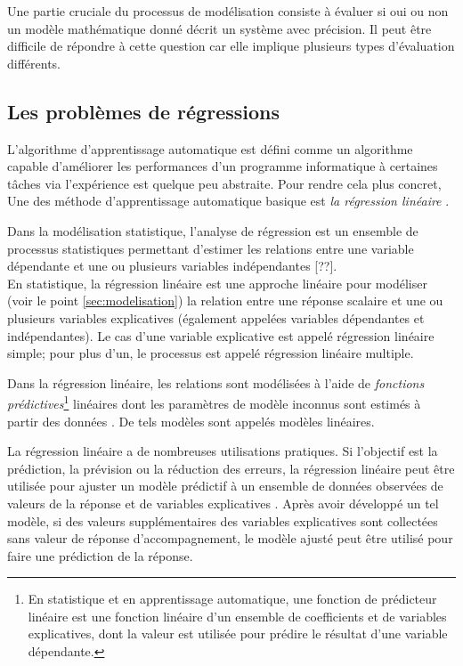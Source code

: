	
	Une partie cruciale du processus de modélisation consiste à évaluer si oui ou non un modèle mathématique donné décrit un système avec précision. Il peut être difficile de répondre à cette question car elle implique plusieurs types d'évaluation différents.
	
	

	\subsection{Les problèmes de régressions}
	
	L'algorithme d'apprentissage automatique est défini comme un algorithme capable d'améliorer les performances d'un programme informatique à certaines tâches via l'expérience est quelque peu abstraite. Pour rendre cela plus concret, Une des méthode d'apprentissage automatique basique est \emph{la régression linéaire} \cite{goodfellow2016deep}.
	
	Dans la modélisation statistique, l'analyse de régression est un ensemble de processus statistiques permettant d'estimer les relations entre une variable dépendante et une ou plusieurs variables indépendantes [??].\\
	En statistique, la régression linéaire est une approche linéaire pour modéliser (voir le point \ref{sec:modelisation}) la relation entre une réponse scalaire et une ou plusieurs variables explicatives (également appelées variables dépendantes et indépendantes). Le cas d'une variable explicative est appelé régression linéaire simple; pour plus d'un, le processus est appelé régression linéaire multiple.
	
	Dans la régression linéaire, les relations sont modélisées à l'aide de \textit{fonctions prédictives}\footnote{En statistique et en apprentissage automatique, une fonction de prédicteur linéaire est une fonction linéaire d'un ensemble de coefficients et de variables explicatives, dont la valeur est utilisée pour prédire le résultat d'une variable dépendante.} linéaires dont les paramètres de modèle inconnus sont estimés à partir des données \cite{matloff2017statistical}. De tels modèles sont appelés modèles linéaires.
	
	La régression linéaire a de nombreuses utilisations pratiques. Si l'objectif est la prédiction, la prévision ou la réduction des erreurs, la régression linéaire peut être utilisée pour ajuster un modèle prédictif à un ensemble de données observées de valeurs de la réponse et de variables explicatives \cite{darlington2016regression}. Après avoir développé un tel modèle, si des valeurs supplémentaires des variables explicatives sont collectées sans valeur de réponse d'accompagnement, le modèle ajusté peut être utilisé pour faire une prédiction de la réponse.
	
